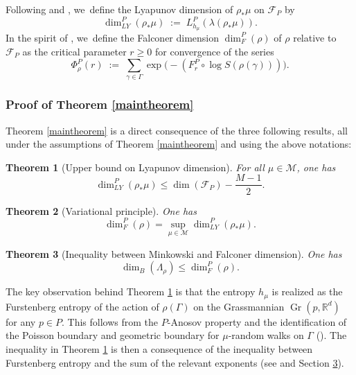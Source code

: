 \documentclass[10pt,a4paper]{amsart}
\newtheorem{theorem}{Theorem}[section]
\newcommand{\R}{\mathbb{R}}
\newcommand{\F}{\mathcal{F}}
\newcommand{\M}{\mathcal M}
\let\G\Gamma
\DeclareMathOperator{\Gr}{Gr}
\begin{document}
Following \cite{DO80} and \cite{KY79}, we~define the Lyapunov dimension of \(\rho_*\mu\) on \(\F_P\) by
\begin{equation}\label{dimlyap:definition}\dim_{LY}^P(\rho_*\mu) \; := \; L_{h_\mu}^P (\lambda(\rho_*\mu)). \end{equation}
In the spirit of \cite{Fal88}, we~define the Falconer dimension \(\dim_F^P(\rho)\) of \(\rho\) relative to~\(\F_P\) as the critical parameter \(r \ge 0\) for convergence of the series
\begin{equation}\label{falconerseries} \Phi_\rho^P (r) \; := \; \sum_{\gamma \in \Gamma} \exp \bigl(-(F_r^P\circ\log S(\rho(\gamma)))\bigr).\end{equation}

\subsubsection{Proof of Theorem \ref{maintheorem}}

Theorem \ref{maintheorem} is a direct consequence of the three following results, all under the assumptions of Theorem \ref{maintheorem} and using the above notations:

\begin{theorem}[Upper bound on Lyapunov dimension]\label{theorema}
For all \(\mu \in \M\), one has
\[
\dim_{LY}^P(\rho_*\mu) \le \dim(\F_P) - \frac{M - 1}{2}.
\]
\end{theorem}

\begin{theorem}[Variational principle]\label{theoremb}
One has \begin{equation} \label{Lyapunov} \dim_F^P(\rho) = \sup_{\mu \in \M}\dim_{LY}^P(\rho_*\mu).\end{equation}
\end{theorem}

\begin{theorem}[Inequality between Minkowski and Falconer dimension]\label{theoremc}
One has
\[
\dim_B(\Lambda_\rho) \le \dim_F^P(\rho).
\]
\end{theorem}

The key observation behind Theorem \ref{theorema} is that the entropy \(h_\mu\) is realized as the Furstenberg entropy of the action of \(\rho (\G)\) on the Grassmannian \(\Gr(p,\R^d)\) for any \(p \in P\). This follows from the \(P\)-Anosov property and the identification of the Poisson boundary and geometric boundary for \(\mu\)-random walks on \(\Gamma\) (\cite{Kai00}). The inequality in Theorem \ref{theorema} is then a consequence of the inequality between Furstenberg entropy and the sum of the relevant exponents (see \cite{LL23} and Section \href{https://jep.centre-mersenne.org/item/10.5802/jep.285.pdf#page=14}{3}).
\end{document}
